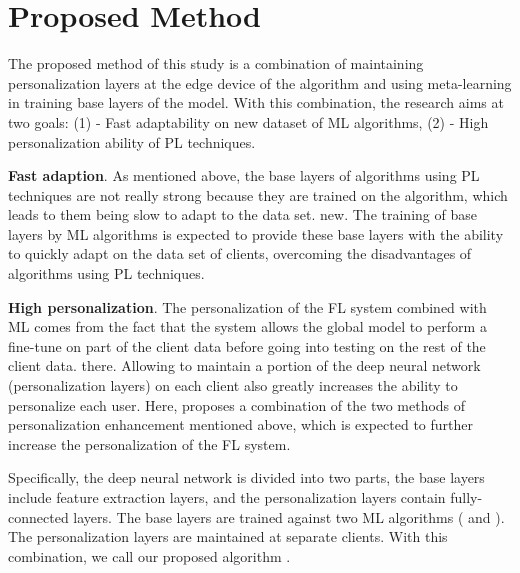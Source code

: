 \documentclass[runningheads]{llncs}
\begin{document}
\section{Proposed Method}

The proposed method of this study is a combination of maintaining personalization layers at the edge device of the algorithm  and using meta-learning in training base layers of the model. With this combination, the research aims at two goals: (1) - Fast adaptability on new dataset of ML algorithms, (2) - High personalization ability of PL techniques.

\textbf{Fast adaption}. As mentioned above, the base layers of algorithms using PL techniques are not really strong because they are trained on the  algorithm, which leads to them being slow to adapt to the data set. new. The training of base layers by ML algorithms is expected to provide these base layers with the ability to quickly adapt on the data set of clients, overcoming the disadvantages of algorithms using PL techniques.

\textbf{High personalization}. The personalization of the FL system combined with ML comes from the fact that the system allows the global model to perform a fine-tune on part of the client data before going into testing on the rest of the client data. there. Allowing to maintain a portion of the deep neural network (personalization layers) on each client also greatly increases the ability to personalize each user. Here,  proposes a combination of the two methods of personalization enhancement mentioned above, which is expected to further increase the personalization of the FL system.

Specifically, the deep neural network is divided into two parts, the base layers include feature extraction layers, and the personalization layers contain fully-connected layers. The base layers are trained against two ML algorithms ( and ). The personalization layers are maintained at separate clients. With this combination, we call our proposed algorithm .
\end{document}
